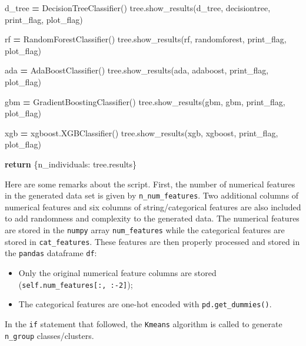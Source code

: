 \documentclass[
]{book}
\newenvironment{Shaded}{\begin{snugshade}}{\end{snugshade}}
\newcommand{\ControlFlowTok}[1]{\textcolor[rgb]{0.13,0.29,0.53}{\textbf{#1}}}
\newcommand{\NormalTok}[1]{#1}
\newcommand{\OperatorTok}[1]{\textcolor[rgb]{0.81,0.36,0.00}{\textbf{#1}}}
\newcommand{\StringTok}[1]{\textcolor[rgb]{0.31,0.60,0.02}{#1}}
\providecommand{\tightlist}{%
  \setlength{\itemsep}{0pt}\setlength{\parskip}{0pt}}
\theoremstyle{definition}
\theoremstyle{definition}
\theoremstyle{definition}
\theoremstyle{definition}
\theoremstyle{remark}
\begin{document}
\begin{Shaded}
\begin{Highlighting}[]
\NormalTok{        d\_tree }\OperatorTok{=}\NormalTok{ DecisionTreeClassifier()}
\NormalTok{        tree.show\_results(d\_tree, }\StringTok{\textquotesingle{}decisiontree\textquotesingle{}}\NormalTok{, print\_flag, plot\_flag)}

\NormalTok{        rf }\OperatorTok{=}\NormalTok{ RandomForestClassifier()}
\NormalTok{        tree.show\_results(rf, }\StringTok{\textquotesingle{}randomforest\textquotesingle{}}\NormalTok{, print\_flag, plot\_flag)}

\NormalTok{        ada }\OperatorTok{=}\NormalTok{ AdaBoostClassifier()}
\NormalTok{        tree.show\_results(ada, }\StringTok{\textquotesingle{}adaboost\textquotesingle{}}\NormalTok{, print\_flag, plot\_flag)}

\NormalTok{        gbm }\OperatorTok{=}\NormalTok{ GradientBoostingClassifier()}
\NormalTok{        tree.show\_results(gbm, }\StringTok{\textquotesingle{}gbm\textquotesingle{}}\NormalTok{, print\_flag, plot\_flag)}

\NormalTok{        xgb }\OperatorTok{=}\NormalTok{ xgboost.XGBClassifier()}
\NormalTok{        tree.show\_results(xgb, }\StringTok{\textquotesingle{}xgboost\textquotesingle{}}\NormalTok{, print\_flag, plot\_flag)}

        \ControlFlowTok{return}\NormalTok{ \{n\_individuals: tree.results\}}
\end{Highlighting}
\end{Shaded}

Here are some remarks about the script. First, the number of numerical features in the generated data set is given by \texttt{n\_num\_features}. Two additional columns of numerical features and six columns of string/categorical features are also included to add randomness and complexity to the generated data. The numerical features are stored in the \texttt{numpy} array \texttt{num\_features} while the categorical features are stored in \texttt{cat\_features}. These features are then properly processed and stored in the \texttt{pandas} dataframe \texttt{df}:

\begin{itemize}
\tightlist
\item
  Only the original numerical feature columns are stored (\texttt{self.num\_features{[}:,\ :-2{]}});
\item
  The categorical features are one-hot encoded with \texttt{pd.get\_dummies()}.
\end{itemize}

In the \texttt{if} statement that followed, the \texttt{Kmeans} algorithm is called to generate \texttt{n\_group} classes/clusters.
\end{document}
